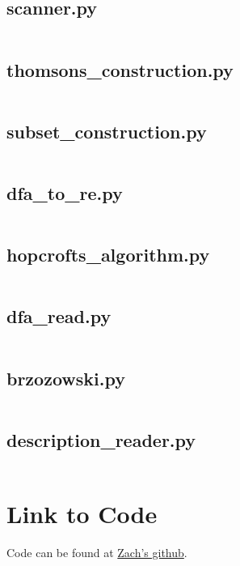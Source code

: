\documentclass{article}
\begin{document}
\subsection{scanner.py}
\label{code:scanner}
\inputminted{python}{./scanner.py}

\subsection{thomsons\_construction.py}
\label{code:thompsons}
\inputminted{python}{./thomsons_construction.py}

\subsection{subset\_construction.py}
\label{code:subset}
\inputminted{python}{./subset_construction.py}

\subsection{dfa\_to\_re.py}
\label{code:dfaToRe}
\inputminted{python}{./dfa_to_re.py}

\subsection{hopcrofts\_algorithm.py}
\label{code:hopcrofts}
\inputminted{python}{./hopcrofts_algorithm.py}

\subsection{dfa\_read.py}
\label{code:dfaRead}
\inputminted{python}{./dfa_read.py}

\subsection{brzozowski.py}
\label{code:brzo}
\inputminted{python}{./brzozowski.py}

\subsection{description\_reader.py}
\label{code:descriptionReader}
\inputminted{python}{./description_reader.py}

\section*{Link to Code}
Code can be found at \href{https://github.com/zinfidel/cs554-project1}{Zach's github}.
\end{document}
